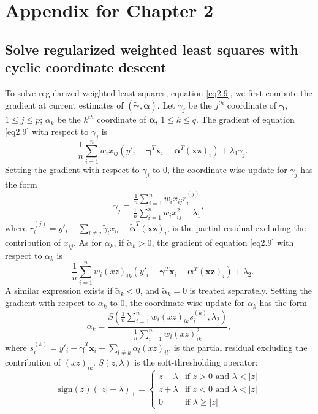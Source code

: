\section{Appendix for Chapter 2}

\subsection{Solve regularized weighted least squares with cyclic coordinate descent}
\label{a.1}
To solve regularized weighted least squares, equation \eqref{eq2.9}, we first compute the gradient at current estimates of $(\tilde{\bm{\gamma}}, \tilde{\bm{\alpha}})$. Let $\gamma_j$ be the $j^{th}$ coordinate of $\bm{\gamma}$, $1\leq j\leq p$; $\alpha_k$ be the $k^{th}$ coordinate of $\bm{\alpha}$, $1\leq k\leq q$. The gradient of equation \ref{eq2.9} with respect to $\gamma_j$ is 
\begin{displaymath}
-\frac{1}{n} \sum_{i=1}^n w_ix_{ij}(y'_i-\bm{\gamma}^T\bm{x}_i-\bm{\alpha}^T(
\bm{xz})_i) + \lambda_1\gamma_j.
\end{displaymath}
Setting the gradient with respect to $\gamma_j$ to 0, the coordinate-wise update for $\gamma_j$ has the form 
\begin{displaymath}
\gamma_j = \frac{\frac{1}{n}\sum_{i=1}^n w_ix_{ij}r_i^{(j)}}{\frac{1}{n}\sum_{i=1}^nw_ix_{ij}^2+\lambda_1},
\end{displaymath}
where $r_i^{(j)}=y'_i-\sum_{l\neq j}\tilde{\gamma}_lx_{il}-\tilde{\bm{\alpha}}^T(\bm{xz})_i$, is the partial residual excluding the contribution of $x_{ij}$. As for $\alpha_k$, if $\tilde{\alpha}_k>0$, the gradient of equation \eqref{eq2.9} with respect to $\alpha_k$ is 
\begin{displaymath}
-\frac{1}{n}\sum_{i=1}^n w_i(xz)_{ik}(y'_i-\bm{\gamma}^T\bm{x}_i-\bm{\alpha}^T(
\bm{xz})_i) + \lambda_2.
\end{displaymath}
A similar expression exists if $\tilde{\alpha}_k<0$, and $\tilde{\alpha}_k=0$ is treated separately. Setting the gradient with respect to $\alpha_k$ to 0, the coordinate-wise update for $\alpha_k$ has the form 
\begin{displaymath}
\alpha_k = \frac{S(\frac{1}{n}\sum_{i=1}^n w_i(xz)_{ik}s_i^{(k)}, \lambda_2)}{\frac{1}{n}\sum_{i=1}^n w_i(xz)_{ik}^2},
\end{displaymath}
where $s_i^{(k)}=y'_i-\tilde{\bm{\gamma}}^T\bm{x}_i-\sum_{l\neq k}\tilde{\alpha}_l(xz)_{il}$, is the partial residual excluding the contribution of $(xz)_{ik}$. $S(z,\lambda)$ is the soft-thresholding operator:
\begin{equation*}
    \text{sign}(z)(|z|-\lambda)_+ = 
        \begin{cases}
            z-\lambda & \text{if $z>0$ and $\lambda<|z|$}\\
            z+\lambda & \text{if $z<0$ and $\lambda<|z|$}\\
            0 & \text{if $\lambda \geq |z|$}
        \end{cases}       
\end{equation*}


